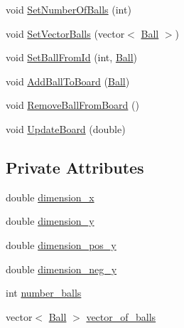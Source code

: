 \begin{DoxyCompactItemize}
void \hyperlink{classBoard_abf2f2750ff34813b72a3b7642ad592d2}{Set\+Number\+Of\+Balls} (int)
\item 
void \hyperlink{classBoard_adc03b83ba8b8a268f5e5498f65f18e0d}{Set\+Vector\+Balls} (vector$<$ \hyperlink{classBall}{Ball} $>$)
\item 
void \hyperlink{classBoard_aef6af921107ced16387ae844eaee7cf6}{Set\+Ball\+From\+Id} (int, \hyperlink{classBall}{Ball})
\item 
void \hyperlink{classBoard_ae6bdd398db4c50fb6b6598aedb267dc4}{Add\+Ball\+To\+Board} (\hyperlink{classBall}{Ball})
\item 
void \hyperlink{classBoard_ac1e5115cbbf774b92c68c1dc1b1ffb45}{Remove\+Ball\+From\+Board} ()
\item 
void \hyperlink{classBoard_af19eeae45cb4bf01b8e65f5c242d151e}{Update\+Board} (double)
\end{DoxyCompactItemize}
\subsection*{Private Attributes}
\begin{DoxyCompactItemize}
\item 
double \hyperlink{classBoard_a0999b31427ac9b9cf2444bc73d2a4c79}{dimension\+\_\+x}
\item 
double \hyperlink{classBoard_a7133e5c99e2ed0b9ec6d28c8ec8d783d}{dimension\+\_\+y}
\item 
double \hyperlink{classBoard_af370b0cf956d4a5d1e38250d21c29dfb}{dimension\+\_\+pos\+\_\+y}
\item 
double \hyperlink{classBoard_ac36d9ad3798ef9d45d464efcbc2c5694}{dimension\+\_\+neg\+\_\+y}
\item 
int \hyperlink{classBoard_a3f5f80a78c7925c8e33d8e08d4799b9d}{number\+\_\+balls}
\item 
vector$<$ \hyperlink{classBall}{Ball} $>$ \hyperlink{classBoard_a2f3f6dcb96ea6cd77d7c6b3305f8a5d3}{vector\+\_\+of\+\_\+balls}
\end{DoxyCompactItemize}


